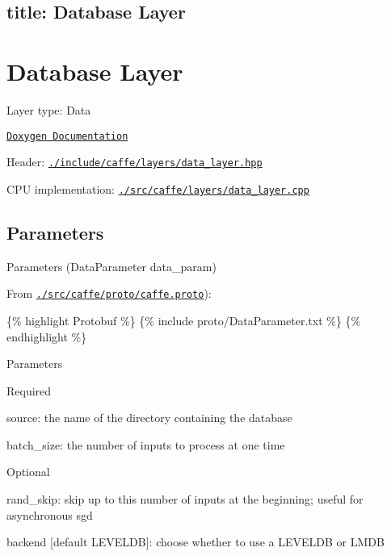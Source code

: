 

 \subsection*{title\+: Database Layer }

\section*{Database Layer}


\begin{DoxyItemize}
\item Layer type\+: {\ttfamily Data}
\item \href{http://caffe.berkeleyvision.org/doxygen/classcaffe_1_1DataLayer.html}{\tt Doxygen Documentation}
\item Header\+: \href{https://github.com/BVLC/caffe/blob/master/include/caffe/layers/data_layer.hpp}{\tt {\ttfamily ./include/caffe/layers/data\+\_\+layer.hpp}}
\item C\+PU implementation\+: \href{https://github.com/BVLC/caffe/blob/master/src/caffe/layers/data_layer.cpp}{\tt {\ttfamily ./src/caffe/layers/data\+\_\+layer.cpp}}
\end{DoxyItemize}

\subsection*{Parameters}


\begin{DoxyItemize}
\item Parameters ({\ttfamily Data\+Parameter data\+\_\+param})
\item From \href{https://github.com/BVLC/caffe/blob/master/src/caffe/proto/caffe.proto}{\tt {\ttfamily ./src/caffe/proto/caffe.proto}})\+:
\end{DoxyItemize}

\{\% highlight Protobuf \%\} \{\% include proto/\+Data\+Parameter.\+txt \%\} \{\% endhighlight \%\}


\begin{DoxyItemize}
\item Parameters
\begin{DoxyItemize}
\item Required
\begin{DoxyItemize}
\item {\ttfamily source}\+: the name of the directory containing the database
\item {\ttfamily batch\+\_\+size}\+: the number of inputs to process at one time
\end{DoxyItemize}
\item Optional
\begin{DoxyItemize}
\item {\ttfamily rand\+\_\+skip}\+: skip up to this number of inputs at the beginning; useful for asynchronous sgd
\item {\ttfamily backend} \mbox{[}default {\ttfamily L\+E\+V\+E\+L\+DB}\mbox{]}\+: choose whether to use a {\ttfamily L\+E\+V\+E\+L\+DB} or {\ttfamily L\+M\+DB} 
\end{DoxyItemize}
\end{DoxyItemize}
\end{DoxyItemize}